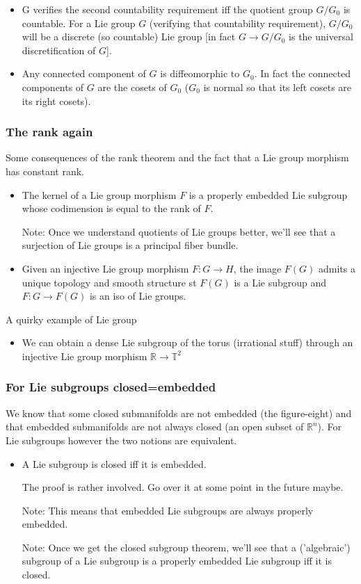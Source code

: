 \documentclass{report}
\theoremstyle{definition}
\begin{document}
\begin{itemize}
    \item G verifies the second countability requirement iff the quotient group $G/G_0$ is countable. For a Lie group $G$ (verifying that countability requirement), $G/G_0$ will be a discrete (so countable) Lie group [in fact $G\rightarrow G/G_0$ is the universal discretification of $G$].

    \item Any connected component of $G$ is diffeomorphic to $G_0$. In fact the connected components of $G$ are the cosets of $G_0$ ($G_0$ is normal so that its left cosets are its right cosets).
\end{itemize}

\subsubsection{The rank again}

Some consequences of the rank theorem and the fact that a Lie group morphism has constant rank.

\begin{itemize}
    \item The kernel of a Lie group morphism $F$ is a properly embedded Lie subgroup whose codimension is equal to the rank of $F$.

    Note: Once we understand quotients of Lie groups better, we'll see that a surjection of Lie groups is a principal fiber bundle.
    \item Given an injective Lie group morphism $F:G\rightarrow H$, the image $F(G)$ admits a unique topology and smooth structure st $F(G)$ is a Lie subgroup and $F:G\rightarrow F(G)$ is an iso of Lie groups.
\end{itemize}

A quirky example of Lie group
\begin{itemize}
    \item We can obtain a dense Lie subgroup of the torus (irrational stuff) through an injective Lie group morphism $\mathbb{R}\rightarrow \mathbb{T}^2$
\end{itemize}

\subsubsection{For Lie subgroups closed=embedded}

We know that some closed submanifolds are not embedded (the figure-eight) and that embedded submanifolds are not always closed (an open subset of $\mathbb{R}^n$). For Lie subgroups however the two notions are equivalent.
\begin{itemize}
    \item A Lie subgroup is closed iff it is embedded.

    The proof is rather involved. Go over it at some point in the future maybe.

    Note: This means that embedded Lie subgroups are always properly embedded.

    Note: Once we get the closed subgroup theorem, we'll see that a ('algebraic') subgroup of a Lie subgroup is a properly embedded Lie subgroup iff it is closed.
\end{itemize}
\end{document}
